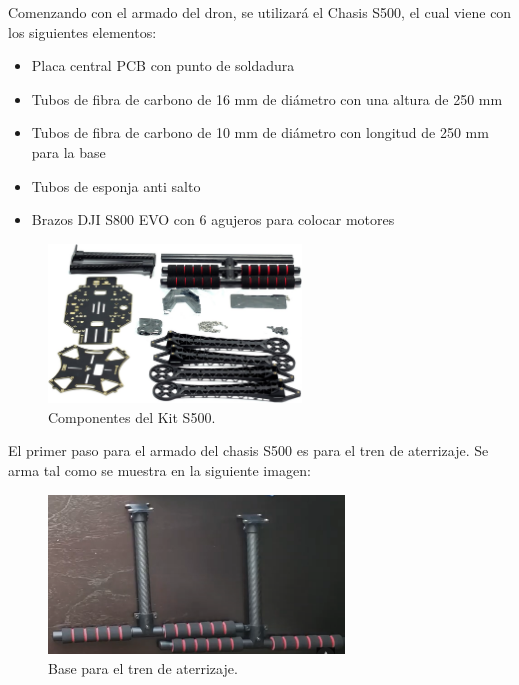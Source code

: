 \noindent Comenzando con el armado del dron, se utilizará el Chasis S500, el cual viene con los siguientes elementos:
\begin{itemize}[itemsep=3pt,parsep=0pt,topsep=0pt,partopsep=0pt]
  \item Placa central PCB con punto de soldadura
  \item Tubos de fibra de carbono de 16 mm de diámetro con una altura de 250 mm
  \item Tubos de fibra de carbono de 10 mm de diámetro con longitud de 250 mm para la base
  \item Tubos de esponja anti salto
  \item Brazos DJI S800 EVO con 6 agujeros para colocar motores
\end{itemize}
\begin{figure}[H]
    \centering
    \includegraphics[width=0.6\textwidth]{imagenes/componenteskit.png}
    \caption{Componentes del Kit S500.}
    \label{fig:kitS500}
\end{figure}
El primer paso para el armado del chasis S500 es para el tren de aterrizaje. Se arma tal como se muestra en la siguiente imagen:
\begin{figure}[H]
    \centering
    \includegraphics[width=0.7\textwidth]{imagenes/base-tren.png}
    \caption{Base para el tren de aterrizaje.}
    \label{fig:basetren}
\end{figure}

